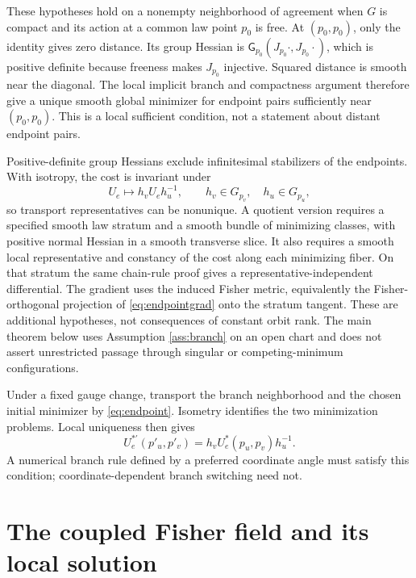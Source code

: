 \documentclass[11pt]{article}
\newcommand{\G}{\mathsf G}
\begin{document}
These hypotheses hold on a nonempty neighborhood of agreement when $G$ is compact and its action at a common law point $p_0$ is free. At $(p_0,p_0)$, only the identity gives zero distance. Its group Hessian is $\G_{p_0}(J_{p_0}\cdot,J_{p_0}\cdot)$, which is positive definite because freeness makes $J_{p_0}$ injective. Squared distance is smooth near the diagonal. The local implicit branch and compactness argument therefore give a unique smooth global minimizer for endpoint pairs sufficiently near $(p_0,p_0)$. This is a local sufficient condition, not a statement about distant endpoint pairs.

Positive-definite group Hessians exclude infinitesimal stabilizers of the endpoints. With isotropy, the cost is invariant under
\begin{equation}
 U_e\longmapsto h_vU_eh_u^{-1},\qquad
 h_v\in G_{p_v},\quad h_u\in G_{p_u},
\end{equation}
so transport representatives can be nonunique. A quotient version requires a specified smooth law stratum and a smooth bundle of minimizing classes, with positive normal Hessian in a smooth transverse slice. It also requires a smooth local representative and constancy of the cost along each minimizing fiber. On that stratum the same chain-rule proof gives a representative-independent differential. The gradient uses the induced Fisher metric, equivalently the Fisher-orthogonal projection of \eqref{eq:endpointgrad} onto the stratum tangent. These are additional hypotheses, not consequences of constant orbit rank. The main theorem below uses Assumption \ref{ass:branch} on an open chart and does not assert unrestricted passage through singular or competing-minimum configurations.

Under a fixed gauge change, transport the branch neighborhood and the chosen initial minimizer by \eqref{eq:endpoint}. Isometry identifies the two minimization problems. Local uniqueness then gives
\begin{equation}
 U_e^{*\prime}(p'_u,p'_v)=h_vU_e^*(p_u,p_v)h_u^{-1}.
 \label{eq:branchgauge}
\end{equation}
A numerical branch rule defined by a preferred coordinate angle must satisfy this condition; coordinate-dependent branch switching need not.

\section{The coupled Fisher field and its local solution}
\end{document}
